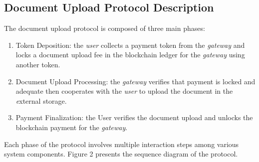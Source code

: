 \documentclass[conference]{IEEEtran}
\begin{document}
\subsection{Document Upload Protocol Description}
The document upload protocol is composed of three main phases:
\begin{enumerate}
\item Token Deposition: the {\it user} collects a payment token from the {\it gateway} and locks a document upload fee in the blockchain ledger for the {\it gateway} using another token.
\item Document Upload Processing: the {\it gateway} verifies that payment is locked and adequate then cooperates with the \textit{user} to upload the document in the {\textit external storage}.
\item Payment Finalization: the User verifies the document upload and unlocks the blockchain payment for the {\it gateway}.
\end{enumerate}
Each phase of the protocol involves multiple interaction steps among various system components. Figure 2 presents the sequence diagram of the protocol.
\end{document}

